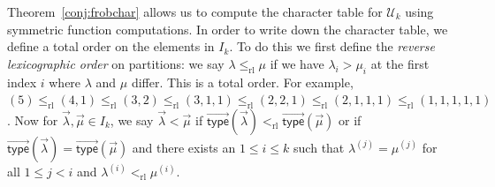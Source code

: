 \documentclass[ALCO,Unicode]{cedram}
\newcommand{\defncolor}{\color{darkred}}
\newcommand{\defn}[1]{{\defncolor\emph{#1}}} %
\newcommand{\vtype}{\overrightarrow{\mathsf{type}}}
\begin{document}
Theorem~\ref{conj:frobchar} allows us to compute the character table for
$\mathcal{U}_k$ using symmetric function computations.
In order to write down the character table, we define a total order on the elements in $I_k$.  To do this we first define the \defn{reverse lexicographic order}
on partitions: we say \defn{$\lambda\leqslant_{\mathrm{rl}} \mu$} if we have $\lambda_i > \mu_i$ at the first index $i$ where $\lambda$ and $\mu$ differ.
This is a total order. For example, $(5) \leqslant_{\mathrm{rl}} (4,1) \leqslant_{\mathrm{rl}} (3,2) \leqslant_{\mathrm{rl}} (3,1,1) \leqslant_{\mathrm{rl}} (2,2,1) \leqslant_{\mathrm{rl}} (2,1,1,1) \leqslant_{\mathrm{rl}} (1,1,1,1,1)$.
Now for $\vec{\lambda},\vec{\mu}\in I_k$, we say \defn{$\vec{\lambda}< \vec{\mu}$} if
$\vtype(\vec{\lambda}) <_{\mathrm{rl}} \vtype(\vec{\mu})$ or if $\vtype(\vec{\lambda}) = \vtype(\vec{\mu})$ and there exists an
$1 \leqslant i \leqslant k$ such that $\lambda^{(j)} = \mu^{(j)}$ for all $1 \leqslant j < i$ and
$\lambda^{(i)} <_{\mathrm{rl}} \mu^{(i)}$.
\end{document}
